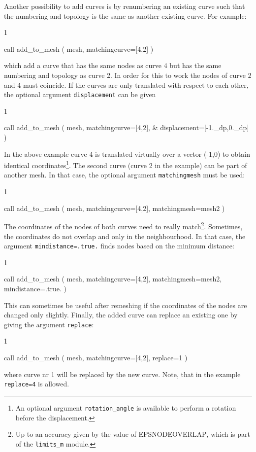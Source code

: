 Another possibility to add curves is by renumbering an existing curve such that
the numbering and topology is the same as another existing curve. For example:
\begin{listing}{1}

  call add_to_mesh ( mesh, matchingcurve=[4,2] )
   
\end{listing}
which add a curve that has the same nodes as curve 4 but has the same numbering
and topology as curve 2. In order for this to work the nodes of curve 2 and 4
must coincide. If the curves are only translated with respect to each other,
the optional argument \texttt{displacement} can be given
\begin{listing}{1}

  call add_to_mesh ( mesh, matchingcurve=[4,2], &
                                   displacement=[-1._dp,0._dp] )
   
\end{listing}
In the above example curve 4 is translated virtually over a
vector (-1,0) to obtain identical coordinates\footnote{An optional argument \texttt{rotation\_angle}
is available to perform a rotation before the displacement.}. The second curve (curve
2 in the example) can be part of another mesh. In that case, the optional
argument \texttt{matchingmesh} must be used:
\begin{listing}{1}

  call add_to_mesh ( mesh, matchingcurve=[4,2], matchingmesh=mesh2 )
   
\end{listing}
The coordinates of the nodes of both curves need to really match\footnote{Up to an accuracy given by the value of \textsc{\scriptsize EPSNODEOVERLAP}, which is part of the \texttt{limits\_m} module.}. Sometimes, the coordinates do not overlap and only in the neighbourhood. In that case, the argument \texttt{mindistance=.true.} finds nodes based on the minimum distance:
\begin{listing}{1}

  call add_to_mesh ( mesh, matchingcurve=[4,2], matchingmesh=mesh2, mindistance=.true. )
   
\end{listing}
This can sometimes be useful after remeshing if the coordinates of the nodes are changed only slightly.
Finally, the added curve can replace an existing one by giving the argument
\texttt{replace}:
\begin{listing}{1}

  call add_to_mesh ( mesh, matchingcurve=[4,2], replace=1 )
   
\end{listing}
where curve nr 1 will be replaced by the new curve. Note, that in the example 
\texttt{replace=4} is allowed.

